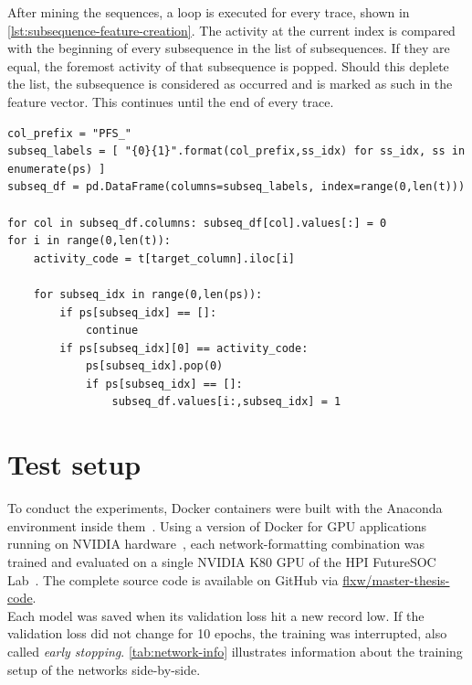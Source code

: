 After mining the sequences, a loop is executed for every trace, shown in \autoref{lst:subsequence-feature-creation}. The activity at the current index is compared with the beginning of every subsequence in the list of subsequences. If they are equal, the foremost activity of that subsequence is popped. Should this deplete the list, the subsequence is considered as occurred and is marked as such in the feature vector. This continues until the end of every trace.

\begin{lstlisting}[caption={Creating the subsequence features.}, label={lst:subsequence-feature-creation}]
col_prefix = "PFS_"
subseq_labels = [ "{0}{1}".format(col_prefix,ss_idx) for ss_idx, ss in enumerate(ps) ]
subseq_df = pd.DataFrame(columns=subseq_labels, index=range(0,len(t)))

for col in subseq_df.columns: subseq_df[col].values[:] = 0
for i in range(0,len(t)):
    activity_code = t[target_column].iloc[i]
    
    for subseq_idx in range(0,len(ps)):
        if ps[subseq_idx] == []:
            continue
        if ps[subseq_idx][0] == activity_code:
            ps[subseq_idx].pop(0)
            if ps[subseq_idx] == []:
                subseq_df.values[i:,subseq_idx] = 1
\end{lstlisting}

\section{Test setup}
\label{sec:eval:test-setup}
To conduct the experiments, Docker containers were built with the Anaconda environment inside them~\cite{web:docker}. Using a version of Docker for GPU applications running on NVIDIA hardware~\cite{web:nvidia-docker}, each network-formatting combination was trained and evaluated on a single NVIDIA K80 GPU of the HPI FutureSOC Lab~\cite{web:fsoc}. The complete source code is available on GitHub via \href{https://github.com/flxw/master-thesis-code}{flxw/master-thesis-code}.\\

Each model was saved when its validation loss hit a new record low. If the validation loss did not change for 10 epochs, the training was interrupted, also called \textit{early stopping}. \autoref{tab:network-info} illustrates information about the training setup of the networks side-by-side.

